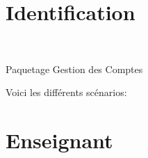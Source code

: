 \section{Identification}

\begin{center}
\\
\par{Paquetage Gestion des Comptes}
\end{center}
Voici les diff{\'e}rents sc{\'e}narios:\\

\section*{Enseignant}

